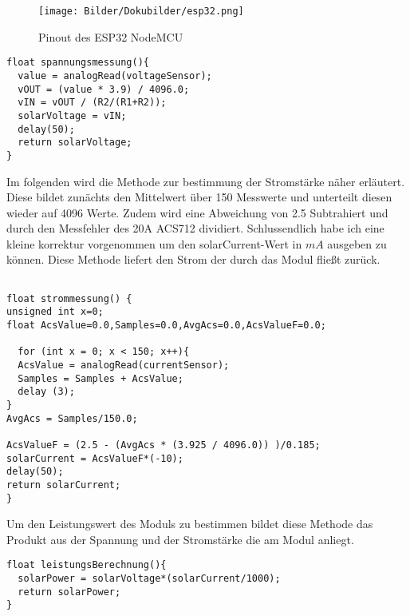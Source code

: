 \documentclass[ngerman]{mucproc}
\newenvironment{minted}[2][]{\endgraf\verbatim}{\endverbatim}
\begin{document}
\begin{figure}
			\centering
			\texttt{[image: Bilder/Dokubilder/esp32.png]}
			\caption{Pinout des ESP32 NodeMCU}
			\label{fig:Pinout ESP32}
		\end{figure}


\begin{verbatim}
float spannungsmessung(){
  value = analogRead(voltageSensor);
  vOUT = (value * 3.9) / 4096.0;
  vIN = vOUT / (R2/(R1+R2));
  solarVoltage = vIN;
  delay(50);
  return solarVoltage;
}
\end{verbatim}

Im folgenden wird die Methode zur bestimmung der Stromstärke näher erläutert. Diese bildet zunächts den Mittelwert über 150 Messwerte und unterteilt diesen wieder auf 4096 Werte. Zudem wird eine Abweichung von 2.5 Subtrahiert und durch den Messfehler des 20A ACS712 dividiert. Schlussendlich habe ich eine kleine korrektur vorgenommen um den solarCurrent-Wert in $mA$ ausgeben zu können. Diese Methode liefert den Strom der durch das Modul fließt zurück. 

\begin{verbatim}

float strommessung() {
unsigned int x=0;
float AcsValue=0.0,Samples=0.0,AvgAcs=0.0,AcsValueF=0.0;

  for (int x = 0; x < 150; x++){ 
  AcsValue = analogRead(currentSensor);        
  Samples = Samples + AcsValue;  
  delay (3); 
}
AvgAcs = Samples/150.0;

AcsValueF = (2.5 - (AvgAcs * (3.925 / 4096.0)) )/0.185;
solarCurrent = AcsValueF*(-10);
delay(50);
return solarCurrent;
}
\end{verbatim}

Um den Leistungswert des Moduls zu bestimmen bildet diese Methode das Produkt aus der Spannung und der Stromstärke die am Modul anliegt.

\begin{verbatim}
float leistungsBerechnung(){
  solarPower = solarVoltage*(solarCurrent/1000);
  return solarPower;
}
\end{verbatim}



\end{document}
